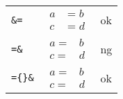 \documentclass[preview]{standalone}
\newcommand{\tA}[1]{\textcolor{cA}{#1}}
\newcommand{\tD}[1]{\textcolor{cD}{#1}}
\begin{document}
\begin{table}[h]
    \centering
    \begin{tabular}{lll}
        \verb|&=|        &
        $\begin{aligned}
                 a & = b \\
                 c & = d
             \end{aligned}$ &
        \tA{ok}            \\[0.3cm]
        \verb|=&|        &
        $\begin{aligned}
                 a = & b \\
                 c = & d
             \end{aligned}$ &
        \tD{ng}            \\[0.3cm]
        \verb|={}&|      &
        $\begin{aligned}
                 a = {} & b \\
                 c = {} & d
             \end{aligned}$ &
        \tA{ok}
    \end{tabular}
\end{table}
\end{document}
